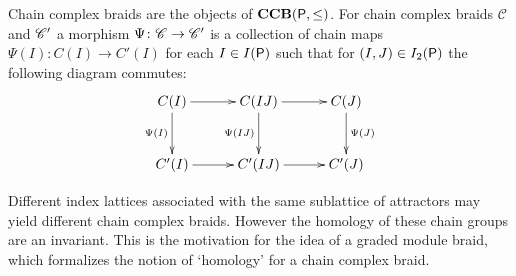 Chain complex braids are the objects of ${\bf CCB}({\mathsf P},\leq)$.  For  chain complex braids $\mathscr{C}$ and $\mathscr{C}'$ a morphism $\Psi\colon \mathscr{C}\to \mathscr{C}'$  is a collection of chain maps $\Psi(I)\colon C(I)\to C'(I)$ for each $I\in I({\mathsf P})$ such that for $(I,J)\in I_2({\mathsf P})$ the following diagram commutes:
\[
\xymatrixcolsep{0.4in}
\xymatrixrowsep{0.4in}
\xymatrix{
C(I) \ar[r] \ar@{->}[d]_{\Psi(I)} & C(IJ) \ar@{->}[d]_{\Psi(IJ)} \ar[r] & C(J) \ar@{->}[d]^{\Psi(J)}  \\
C'(I) \ar[r] & C'(IJ) \ar[r] & C'(J)
}
\] 

Different index lattices associated with the same sublattice of attractors may yield different chain complex braids.  However the homology of these chain groups are an invariant.  This is the motivation for the idea of a graded module braid, which formalizes the notion of `homology' for a chain complex braid.


